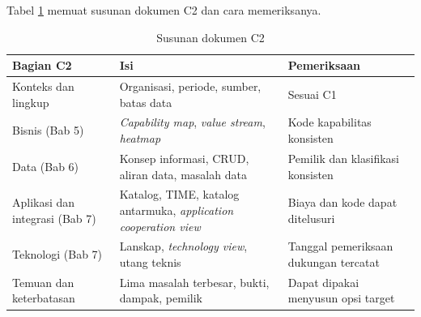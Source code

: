 Tabel \ref{tab:ch07-bagian-c2} memuat susunan dokumen C2 dan cara memeriksanya.

\begin{table}[!htb]
  \centering
  \caption{Susunan dokumen C2}
  \label{tab:ch07-bagian-c2}
  \small
  \begin{tabularx}{\textwidth}{>{\raggedright\arraybackslash}p{3.0cm}>{\raggedright\arraybackslash}X>{\raggedright\arraybackslash}p{3.5cm}}
    \hline
    \textbf{Bagian C2} & \textbf{Isi} & \textbf{Pemeriksaan} \\
    \hline
    Konteks dan lingkup & Organisasi, periode, sumber, batas data & Sesuai C1 \\
    \hline
    Bisnis (Bab 5) & \textit{Capability map}, \textit{value stream}, \textit{heatmap} & Kode kapabilitas konsisten \\
    \hline
    Data (Bab 6) & Konsep informasi, CRUD, aliran data, masalah data & Pemilik dan klasifikasi konsisten \\
    \hline
    Aplikasi dan integrasi (Bab 7) & Katalog, TIME, katalog antarmuka, \textit{application cooperation view} & Biaya dan kode dapat ditelusuri \\
    \hline
    Teknologi (Bab 7) & Lanskap, \textit{technology view}, utang teknis & Tanggal pemeriksaan dukungan tercatat \\
    \hline
    Temuan dan keterbatasan & Lima masalah terbesar, bukti, dampak, pemilik & Dapat dipakai menyusun opsi target \\
    \hline
  \end{tabularx}
\end{table}


